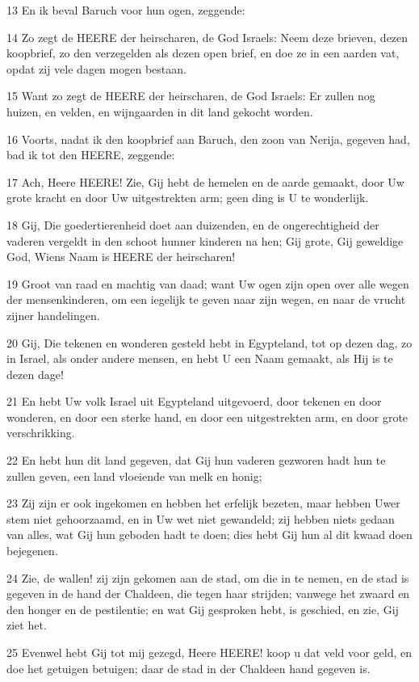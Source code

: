 \par 13 En ik beval Baruch voor hun ogen, zeggende:
\par 14 Zo zegt de HEERE der heirscharen, de God Israels: Neem deze brieven, dezen koopbrief, zo den verzegelden als dezen open brief, en doe ze in een aarden vat, opdat zij vele dagen mogen bestaan.
\par 15 Want zo zegt de HEERE der heirscharen, de God Israels: Er zullen nog huizen, en velden, en wijngaarden in dit land gekocht worden.
\par 16 Voorts, nadat ik den koopbrief aan Baruch, den zoon van Nerija, gegeven had, bad ik tot den HEERE, zeggende:
\par 17 Ach, Heere HEERE! Zie, Gij hebt de hemelen en de aarde gemaakt, door Uw grote kracht en door Uw uitgestrekten arm; geen ding is U te wonderlijk.
\par 18 Gij, Die goedertierenheid doet aan duizenden, en de ongerechtigheid der vaderen vergeldt in den schoot hunner kinderen na hen; Gij grote, Gij geweldige God, Wiens Naam is HEERE der heirscharen!
\par 19 Groot van raad en machtig van daad; want Uw ogen zijn open over alle wegen der mensenkinderen, om een iegelijk te geven naar zijn wegen, en naar de vrucht zijner handelingen.
\par 20 Gij, Die tekenen en wonderen gesteld hebt in Egypteland, tot op dezen dag, zo in Israel, als onder andere mensen, en hebt U een Naam gemaakt, als Hij is te dezen dage!
\par 21 En hebt Uw volk Israel uit Egypteland uitgevoerd, door tekenen en door wonderen, en door een sterke hand, en door een uitgestrekten arm, en door grote verschrikking.
\par 22 En hebt hun dit land gegeven, dat Gij hun vaderen gezworen hadt hun te zullen geven, een land vloeiende van melk en honig;
\par 23 Zij zijn er ook ingekomen en hebben het erfelijk bezeten, maar hebben Uwer stem niet gehoorzaamd, en in Uw wet niet gewandeld; zij hebben niets gedaan van alles, wat Gij hun geboden hadt te doen; dies hebt Gij hun al dit kwaad doen bejegenen.
\par 24 Zie, de wallen! zij zijn gekomen aan de stad, om die in te nemen, en de stad is gegeven in de hand der Chaldeen, die tegen haar strijden; vanwege het zwaard en den honger en de pestilentie; en wat Gij gesproken hebt, is geschied, en zie, Gij ziet het.
\par 25 Evenwel hebt Gij tot mij gezegd, Heere HEERE! koop u dat veld voor geld, en doe het getuigen betuigen; daar de stad in der Chaldeen hand gegeven is.
